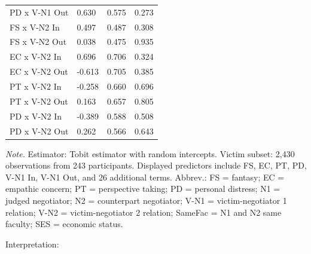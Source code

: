 \documentclass[11pt]{article}
\begin{document}
\begin{table}[H]
{\begin{tabularx}{\textwidth}{>{\raggedright\arraybackslash}Xlll}
PD x V-N1 Out & 0.630 & 0.575 & 0.273 \\
FS x V-N2 In & 0.497 & 0.487 & 0.308 \\
FS x V-N2 Out & 0.038 & 0.475 & 0.935 \\
EC x V-N2 In & 0.696 & 0.706 & 0.324 \\
EC x V-N2 Out & -0.613 & 0.705 & 0.385 \\
PT x V-N2 In & -0.258 & 0.660 & 0.696 \\
PT x V-N2 Out & 0.163 & 0.657 & 0.805 \\
PD x V-N2 In & -0.389 & 0.588 & 0.508 \\
PD x V-N2 Out & 0.262 & 0.566 & 0.643 \\
\bottomrule
\end{tabularx}
}
\end{table}
\begin{flushleft}
\footnotesize\textit{Note.} Estimator: Tobit estimator with random intercepts. Victim subset: 2,430 observations from 243 participants. Displayed predictors include FS, EC, PT, PD, V-N1 In, V-N1 Out, and 26 additional terms. Abbrev.: FS = fantasy; EC = empathic concern; PT = perspective taking; PD = personal distress; N1 = judged negotiator; N2 = counterpart negotiator; V-N1 = victim-negotiator 1 relation; V-N2 = victim-negotiator 2 relation; SameFac = N1 and N2 same faculty; SES = economic status.
\end{flushleft}

Interpretation:
\end{document}
